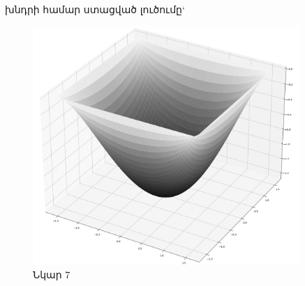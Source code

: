 \documentclass[fleqn, bachelor,subf,12pt,notitlepage]{disser}
\begin{document}
\noindent խնդրի համար ստացված լուծումը`

\begin{figure}[h!]
\centering
\includegraphics[width=0.9\textwidth]{images/poisson_solution}
\captionsetup{labelformat=empty}
\caption{\hfill Նկար 7}
\end{figure}
\end{document}
